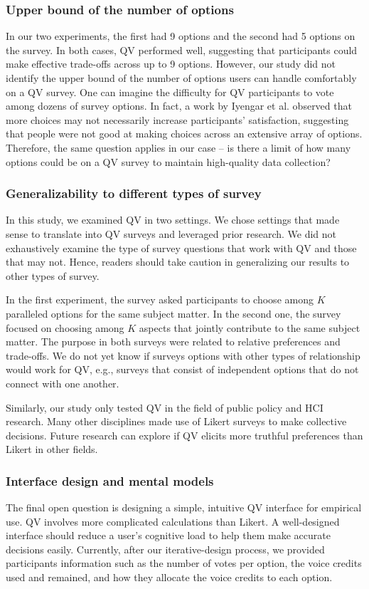 \subsubsection{Upper bound of the number of options}

In our two experiments, the first had 9 options and the second had 5 options on the survey. In both cases, QV performed well, suggesting that participants could make effective trade-offs across up to 9 options. However, our study did not identify the upper bound of the number of options users can handle comfortably on a QV survey. One can imagine the difficulty for QV participants to vote among dozens of survey options. In fact, a work by Iyengar et al. \cite{iyengar2000choice} observed that more choices may not necessarily increase participants' satisfaction, suggesting that people were not good at making choices across an extensive array of options. Therefore, the same question applies in our case -- is there a limit of how many options could be on a QV survey to maintain high-quality data collection?

\subsubsection{Generalizability to different types of survey}
In this study, we examined QV in two settings. We chose settings that made sense to translate into QV surveys and leveraged prior research. We did not exhaustively examine the type of survey questions that work with QV and those that may not. Hence, readers should take caution in generalizing our results to other types of survey.

In the first experiment, the survey asked participants to choose among $K$ paralleled options for the same subject matter. In the second one, the survey focused on choosing among $K$ aspects that jointly contribute to the same subject matter. The purpose in both surveys were related to relative preferences and trade-offs. We do not yet know if surveys options with other types of relationship would work for QV, e.g., surveys that consist of independent options that do not connect with one another.

Similarly, our study only tested QV in the field of public policy and HCI research. Many other disciplines made use of Likert surveys to make collective decisions. Future research can explore if QV elicits more truthful preferences than Likert in other fields.

\subsubsection{Interface design and mental models}
The final open question is designing a simple, intuitive QV interface for empirical use. QV involves more complicated calculations than Likert. A well-designed interface should reduce a user's cognitive load to help them make accurate decisions easily. Currently, after our iterative-design process, we provided participants information such as the number of votes per option, the voice credits used and remained, and how they allocate the voice credits to each option. 

